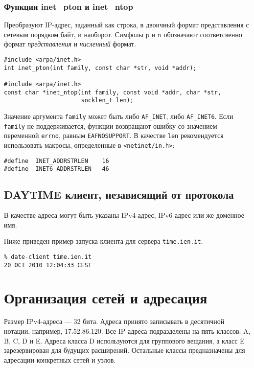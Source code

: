\subsubsection{Функции inet\_pton и inet\_ntop}
Преобразуют IP-адрес, заданный как строка, в двоичный формат представления с сетевым порядком байт, и наоборот. Симфолы p и n обозначают соответсвенно формат \emph{представления} и \emph{численный} формат.
\lstset{language=C,caption=}
\begin{lstlisting}
#include <arpa/inet.h>
int inet_pton(int family, const char *str, void *addr);

#include <arpa/inet.h>
const char *inet_ntop(int family, const void *addr, char *str,
                      socklen_t len);
\end{lstlisting}

Значение аргумента \lstinline{family} может быть либо \lstinline{AF_INET}, либо \lstinline{AF_INET6}. Если \lstinline{family} не поддерживается, функции возвращают ошибку со значением переменной \lstinline{errno}, равным \lstinline{EAFNOSUPPORT}. В качестве \lstinline{len} рекомендуется использовать макросы, определенные в \lstinline{<netinet/in.h>}:
\lstset{language=C,caption=}
\begin{lstlisting}
#define  INET_ADDRSTRLEN    16
#define  INET6_ADDRSTRLEN   46
\end{lstlisting}

\subsection{DAYTIME клиент, независящий от протокола}
В качестве адреса могут быть указаны IPv4-адрес, IPv6-адрес или же доменное имя.

\lstset{label=lst:date-client,caption=DAYTIME клиент}


Ниже приведен пример запуска клиента для сервера \texttt{time.ien.it}.
\lstset{language=,label=lst:client-run,caption=Использование}
\begin{lstlisting}
% date-client time.ien.it
20 OCT 2010 12:04:33 CEST
\end{lstlisting}

\section{Организация сетей и адресация}
\label{sec:network-setup}

Размер IPv4-адреса --- 32 бита. Адреса принято записывать в десятичной нотации, например, 17.52.86.120. Все IP-адреса подразделены на пять классов: A, B, C, D и E. Адреса класса D используются для группового вещания, а класс E зарезервирован для будущих расширений. Остальные классы предназначены для адресации конкретных сетей и узлов.

